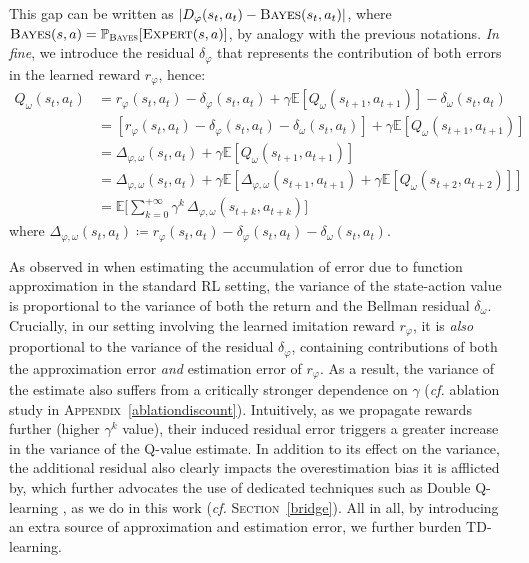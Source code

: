 This gap can be written as
$\lvert D_\varphi(s_t,a_t) - \textsc{Bayes} (s_t,a_t) \rvert$,
where $\textsc{Bayes} (s,a)
= \mathbb{P}_{\textsc{Bayes}}[\textsc{Expert}(s,a)]$,
by analogy with the previous notations.
\textit{In fine}, we introduce the residual $\delta_\varphi$
that represents the contribution of both errors in the learned reward $r_\varphi$, hence:
\begin{align}
Q_\omega(s_t,a_t)
&= r_\varphi(s_t,a_t) - \delta_\varphi(s_t, a_t)
+ \gamma \mathbb{E}[Q_\omega(s_{t+1},a_{t+1})] - \delta_\omega(s_t, a_t) \\
&= [r_\varphi(s_t,a_t) - \delta_\varphi(s_t, a_t) - \delta_\omega(s_t, a_t)]
+ \gamma \mathbb{E}[Q_\omega(s_{t+1},a_{t+1})] \\
&= \Delta_{\varphi,\omega}(s_t, a_t) + \gamma \mathbb{E}[Q_\omega(s_{t+1},a_{t+1})] \\
&= \Delta_{\varphi,\omega}(s_t, a_t) + \gamma \mathbb{E}
[
\Delta_{\varphi,\omega}(s_{t+1}, a_{t+1})
+ \gamma \mathbb{E}[Q_\omega(s_{t+2},a_{t+2})]
] \\
&= \mathbb{E}\Bigg[\sum_{k=0}^{+\infty} \gamma^k \, \Delta_{\varphi,\omega}(s_{t+k}, a_{t+k})\Bigg]
\end{align}
where
$\Delta_{\varphi,\omega}(s_t, a_t)
\coloneqq r_\varphi(s_t,a_t) - \delta_\varphi(s_t, a_t) - \delta_\omega(s_t, a_t)$.

As observed in \cite{Fujimoto2018-pe} when estimating the accumulation of error due to
function approximation in the standard RL setting, the variance of
the state-action value is proportional to the variance of both the return
and the Bellman residual $\delta_\omega$.
Crucially, in our setting involving the learned imitation reward $r_\varphi$,
it is \emph{also} proportional to the
variance of the residual $\delta_\varphi$, containing contributions of
both the approximation error \emph{and} estimation error of $r_\varphi$.
As a result, the variance of the estimate also suffers from
a critically stronger dependence on $\gamma$
(\textit{cf.} ablation study in \textsc{Appendix}~\ref{ablationdiscount}).
Intuitively, as we propagate rewards further (higher $\gamma^k$ value),
their induced residual error triggers a greater increase
in the variance of the Q-value estimate.
In addition to its effect on the variance, the additional residual also clearly
impacts the overestimation bias \cite{Thrun1993-or}
it is afflicted by, which further advocates the use
of dedicated techniques such as Double Q-learning \cite{Fujimoto2018-pe,Van_Hasselt2010-qk},
as we do in this work (\textit{cf.} \textsc{Section}~\ref{bridge}).
All in all, by introducing an extra source of approximation and estimation error,
we further burden TD-learning.

